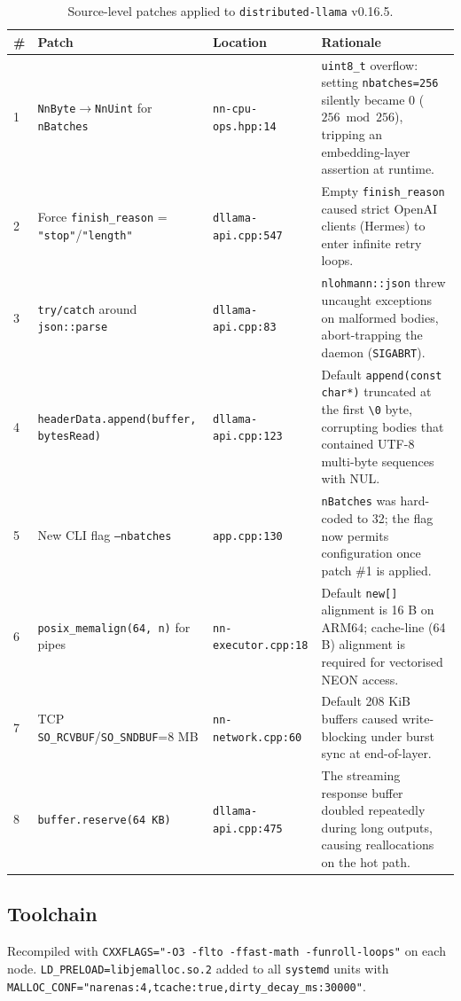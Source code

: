 \documentclass[11pt,a4paper]{article}
\begin{document}
\begin{table}[H]
\centering
\caption{Source-level patches applied to \texttt{distributed-llama} v0.16.5.}
\scriptsize
\begin{tabular}{p{0.3cm}p{4cm}p{3cm}p{6cm}}
\toprule
\# & \textbf{Patch} & \textbf{Location} & \textbf{Rationale} \\
\midrule
1 & \texttt{NnByte}$\rightarrow$\texttt{NnUint} for \texttt{nBatches} & \texttt{nn-cpu-ops.hpp:14} & \texttt{uint8\_t} overflow: setting \texttt{nbatches=256} silently became 0 ($256 \bmod 256$), tripping an embedding-layer assertion at runtime. \\
2 & Force \texttt{finish\_reason} = \texttt{"stop"}/\texttt{"length"} & \texttt{dllama-api.cpp:547} & Empty \texttt{finish\_reason} caused strict OpenAI clients (Hermes) to enter infinite retry loops. \\
3 & \texttt{try/catch} around \texttt{json::parse} & \texttt{dllama-api.cpp:83} & \texttt{nlohmann::json} threw uncaught exceptions on malformed bodies, abort-trapping the daemon (\texttt{SIGABRT}). \\
4 & \texttt{headerData.append(buffer, bytesRead)} & \texttt{dllama-api.cpp:123} & Default \texttt{append(const char*)} truncated at the first \texttt{\textbackslash0} byte, corrupting bodies that contained UTF-8 multi-byte sequences with NUL. \\
5 & New CLI flag \texttt{--nbatches} & \texttt{app.cpp:130} & \texttt{nBatches} was hard-coded to 32; the flag now permits configuration once patch \#1 is applied. \\
6 & \texttt{posix\_memalign(64, n)} for pipes & \texttt{nn-executor.cpp:18} & Default \texttt{new[]} alignment is 16 B on ARM64; cache-line (64 B) alignment is required for vectorised NEON access. \\
7 & TCP \texttt{SO\_RCVBUF}/\texttt{SO\_SNDBUF}=8 MB & \texttt{nn-network.cpp:60} & Default 208 KiB buffers caused write-blocking under burst sync at end-of-layer. \\
8 & \texttt{buffer.reserve(64 KB)} & \texttt{dllama-api.cpp:475} & The streaming response buffer doubled repeatedly during long outputs, causing reallocations on the hot path. \\
\bottomrule
\end{tabular}
\end{table}

\subsection{Toolchain}
Recompiled with \texttt{CXXFLAGS="-O3 -flto -ffast-math -funroll-loops"} on each node. \texttt{LD\_PRELOAD=libjemalloc.so.2} added to all \texttt{systemd} units with \texttt{MALLOC\_CONF="narenas:4,tcache:true,dirty\_decay\_ms:30000"}.
\end{document}

